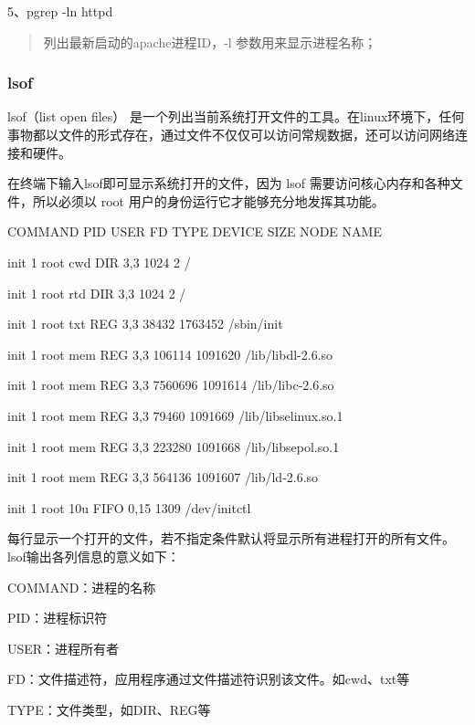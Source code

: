 \documentclass[letterpaper,10pt]{sphinxmanual}
\begin{document}
5、pgrep -ln httpd
\begin{quote}

列出最新启动的apache进程ID，-l 参数用来显示进程名称；
\end{quote}


\subsubsection{lsof}
\label{Linux_pro_mana/tools:lsof}
lsof（list open files） 是一个列出当前系统打开文件的工具。在linux环境下，任何事物都以文件的形式存在，通过文件不仅仅可以访问常规数据，还可以访问网络连接和硬件。

在终端下输入lsof即可显示系统打开的文件，因为 lsof 需要访问核心内存和各种文件，所以必须以 root 用户的身份运行它才能够充分地发挥其功能。

COMMAND    PID      USER   FD      TYPE     DEVICE     SIZE       NODE      NAME

init       1         root  cwd      DIR       3,3       1024       2         /

init       1         root  rtd      DIR       3,3       1024       2         /

init       1         root  txt      REG       3,3       38432      1763452  /sbin/init

init       1         root  mem      REG       3,3       106114     1091620  /lib/libdl-2.6.so

init       1         root  mem      REG       3,3       7560696    1091614  /lib/libc-2.6.so

init       1         root  mem      REG       3,3       79460      1091669  /lib/libselinux.so.1

init       1         root  mem      REG       3,3       223280     1091668  /lib/libsepol.so.1

init       1         root  mem      REG       3,3       564136     1091607  /lib/ld-2.6.so

init       1         root  10u      FIFO      0,15                  1309     /dev/initctl

每行显示一个打开的文件，若不指定条件默认将显示所有进程打开的所有文件。lsof输出各列信息的意义如下：

COMMAND：进程的名称

PID：进程标识符

USER：进程所有者

FD：文件描述符，应用程序通过文件描述符识别该文件。如cwd、txt等

TYPE：文件类型，如DIR、REG等
\end{document}
